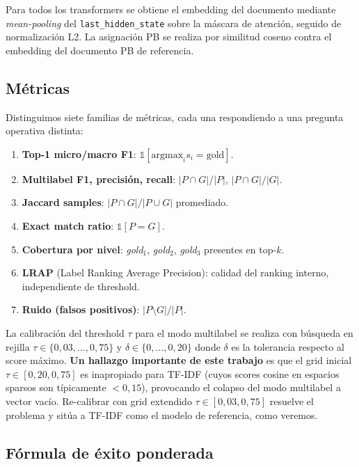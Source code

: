 \documentclass[11pt,a4paper]{article}
\begin{document}
Para todos los transformers se obtiene el embedding del documento mediante \emph{mean-pooling} del \texttt{last\_hidden\_state} sobre la máscara de atención, seguido de normalización L2. La asignación PB se realiza por similitud coseno contra el embedding del documento PB de referencia.

\subsection{Métricas}

Distinguimos siete familias de métricas, cada una respondiendo a una pregunta operativa distinta:

\begin{enumerate}
\item \textbf{Top-1 micro/macro F1}: $\mathbb{1}[\text{argmax}_i s_i = \text{gold}]$.
\item \textbf{Multilabel F1, precisión, recall}: $|P \cap G|/|P|$, $|P \cap G|/|G|$.
\item \textbf{Jaccard samples}: $|P \cap G|/|P \cup G|$ promediado.
\item \textbf{Exact match ratio}: $\mathbb{1}[P = G]$.
\item \textbf{Cobertura por nivel}: \emph{gold}$_1$, \emph{gold}$_2$, \emph{gold}$_3$ presentes en top-$k$.
\item \textbf{LRAP} (Label Ranking Average Precision): calidad del ranking interno, independiente de threshold.
\item \textbf{Ruido (falsos positivos)}: $|P \setminus G|/|P|$.
\end{enumerate}

La calibración del threshold $\tau$ para el modo multilabel se realiza con búsqueda en rejilla $\tau \in \{0{,}03,\ldots,0{,}75\}$ y $\delta \in \{0,\ldots,0{,}20\}$ donde $\delta$ es la tolerancia respecto al score máximo. \textbf{Un hallazgo importante de este trabajo} es que el grid inicial $\tau \in [0{,}20, 0{,}75]$ es inapropiado para TF-IDF (cuyos scores cosine en espacios sparsos son típicamente $<0{,}15$), provocando el colapso del modo multilabel a vector vacío. Re-calibrar con grid extendido $\tau \in [0{,}03, 0{,}75]$ resuelve el problema y sitúa a TF-IDF como el modelo de referencia, como veremos.

\subsection{Fórmula de éxito ponderada}\label{sec:formula}
\end{document}
